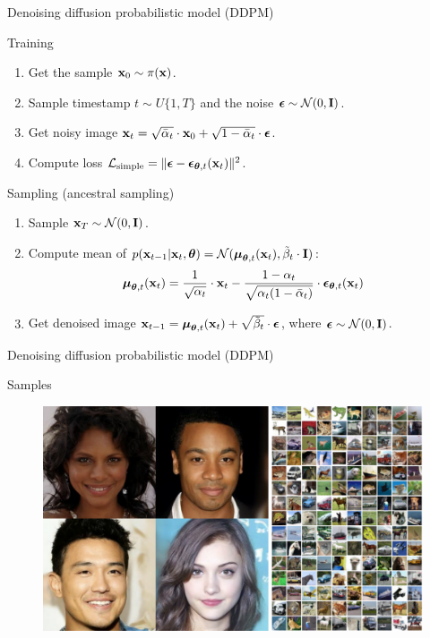 \begin{frame}{Denoising diffusion probabilistic model (DDPM)}
	\begin{block}{Training}
		\begin{enumerate}
			\item Get the sample $\mathbf{x}_0 \sim \pi(\mathbf{x})$.
			\item Sample timestamp $t \sim U\{1, T\}$ and the noise $\boldsymbol{\epsilon} \sim \mathcal{N}(0, \mathbf{I})$.
			\item Get noisy image $\mathbf{x}_t = \sqrt{\bar{\alpha}_t} \cdot \mathbf{x}_0 + \sqrt{1 - \bar{\alpha}_t} \cdot \boldsymbol{\epsilon}$.
			\item Compute loss $ \mathcal{L}_{\text{simple}} = \| \boldsymbol{\epsilon} - \boldsymbol{\epsilon}_{\boldsymbol{\theta}, t}(\mathbf{x}_t) \|^2 $.
		\end{enumerate}
	\end{block}
	\begin{block}{Sampling (ancestral sampling)}
		\begin{enumerate}
			\item Sample $\mathbf{x}_T \sim \mathcal{N}(0, \mathbf{I})$.
			\item Compute mean of $p(\mathbf{x}_{t-1} | \mathbf{x}_t, \boldsymbol{\theta}) = \mathcal{N}(\boldsymbol{\mu}_{\boldsymbol{\theta}, t}(\mathbf{x}_t), \tilde{\beta}_t \cdot \mathbf{I})$:
			\[
				\boldsymbol{\mu}_{\boldsymbol{\theta}, t}(\mathbf{x}_t) = \frac{1}{\sqrt{\alpha_t}} \cdot \mathbf{x}_t - \frac{1 - \alpha_t}{\sqrt{\alpha_t (1 - \bar{\alpha}_t)}} \cdot \boldsymbol{\epsilon}_{\boldsymbol{\theta}, t}(\mathbf{x}_t)
			\]
			\vspace{-0.3cm}
			\item Get denoised image $\mathbf{x}_{t - 1} = \boldsymbol{\mu}_{\boldsymbol{\theta}, t}(\mathbf{x}_t) +  \sqrt{\tilde{\beta}_t} \cdot \boldsymbol{\epsilon}$, where $\boldsymbol{\epsilon} \sim \mathcal{N}(0, \mathbf{I})$.
		\end{enumerate}
	\end{block}
\end{frame}
\begin{frame}{Denoising diffusion probabilistic model (DDPM)}
	\begin{block}{Samples}
		\begin{figure}
			\includegraphics[width=\linewidth]{figs/ddpm_samples}
		\end{figure}
	\end{block}
\end{frame}
